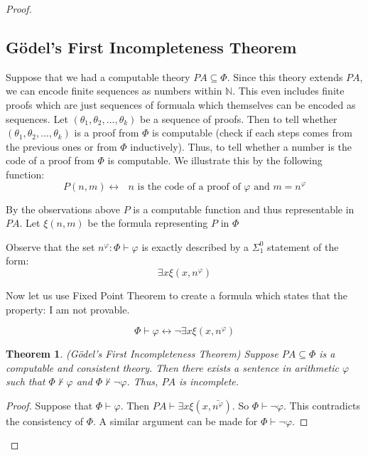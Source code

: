 \documentclass[a4paper,10pt]{article}
\newtheorem{theorem}{Theorem}[section]
\let\phi\varphi
\newcommand*\NN{\mathbb{N}}
\newcommand*\n{\newline\par}
\newcommand*\phibar{\bar{n^{\phi}}}
\newcommand*\prf{\vdash}
\newcommand*\biject{\leftrightarrow}
\begin{document}
\begin{proof}
  \newpage
  \subsection{G\"{o}del's First Incompleteness Theorem}

  Suppose that we had a computable theory $PA \subseteq \Phi$. Since this theory extends $PA$, we can encode finite sequences as numbers within $\NN$. This even includes finite proofs which are just
  sequences of formuala which themselves can be encoded as sequences. Let $(\theta_1,\theta_2, ... , \theta_k)$ be a sequence of proofs. Then to tell whether $(\theta_1,\theta_2, ... , \theta_k)$  is a proof from $\Phi$ is computable (check if each steps comes from the previous ones or from $\Phi$ inductively). Thus, to tell whether a number is the code of a proof from $\Phi$ is computable.
  We illustrate this by the following function:
  \begin{equation*}
   P(n,m) \biject \text{ $n$ is the code of a proof of $\phi$ and $m = n^{\phi}$}
  \end{equation*}

  By the observations above $P$ is a computable function and thus representable in $PA$. Let $\xi(n,m)$ be the formula representing $P$ in $\Phi$\n
  Observe that the set $n^{\phi} : \Phi \prf \phi$ is exactly described by a $\Sigma^0_1$ statement of the form: 
  \begin{equation*}
   \exists x \xi(x,n^{\phi})
  \end{equation*}
 
  
  Now let us use Fixed Point Theorem to create a formula which states that the property: I am not provable.
  
  \begin{equation*}
   \Phi \prf \phi \biject \neg\exists x \xi(x,n^{\phi})
  \end{equation*}
  
  \begin{theorem}
  (G\"{o}del's First Incompleteness Theorem)
  Suppose $PA \subseteq \Phi$ is a computable and consistent theory. Then there exists a sentence in arithmetic $\phi$ such that $\Phi \not\prf \phi$ and $\Phi \not\prf \neg\phi$. Thus, $PA$ is incomplete.
  \end{theorem}


  \begin{proof}
   Suppose that $\Phi \prf \phi$. Then $PA \prf \exists x\xi(x,\phibar)$. So $\Phi \prf \neg\phi$. This contradicts the consistency of $\Phi$. A similar argument can be made for $\Phi \prf \neg\phi$.
  \end{proof} 
  

\end{proof}
\end{document}
